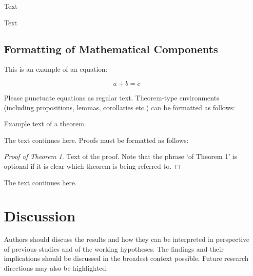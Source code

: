 \documentclass[hydrology,article,submit,moreauthors,pdftex]{Definitions/mdpi}
\begin{document}
Text

Text



\subsection{Formatting of Mathematical Components}

This is an example of an equation:

\begin{equation}
a + b = c
\end{equation}

Please punctuate equations as regular text. Theorem-type environments (including propositions, lemmas, corollaries etc.) can be formatted as follows:
\begin{Theorem}
Example text of a theorem.
\end{Theorem}

The text continues here. Proofs must be formatted as follows:

\begin{proof}[Proof of Theorem 1]
Text of the proof. Note that the phrase `of Theorem 1' is optional if it is clear which theorem is being referred to.
\end{proof}
The text continues here.

\section{Discussion}

Authors should discuss the results and how they can be interpreted in perspective of previous studies and of the working hypotheses. The findings and their implications should be discussed in the broadest context possible. Future research directions may also be highlighted.
\end{document}
